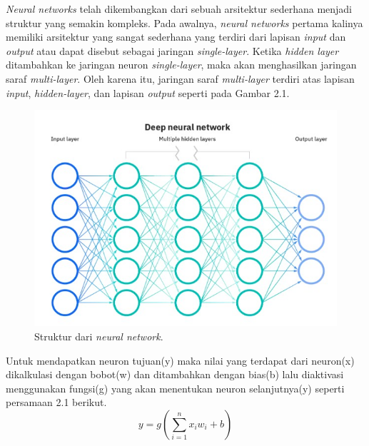 \emph{Neural networks} telah dikembangkan dari sebuah arsitektur sederhana menjadi struktur yang semakin
kompleks. Pada awalnya, \emph{neural networks} pertama kalinya memiliki arsitektur yang sangat sederhana yang terdiri dari lapisan \emph{input} dan \emph{output} atau dapat
disebut sebagai jaringan \emph{single-layer}. Ketika \emph{hidden layer} ditambahkan ke jaringan neuron \emph{single-layer}, maka akan menghasilkan
jaringan saraf \emph{multi-layer}. Oleh karena itu, jaringan saraf \emph{multi-layer} terdiri atas lapisan \emph{input}, \emph{hidden-layer}, dan lapisan \emph{output} seperti pada Gambar 2.1.
\begin{figure}[ht]
  \centering

  \includegraphics[scale=0.7]{gambar/neural-network.jpg}

  \caption{Struktur dari \emph{neural network}.}
  \label{fig:neural-network}
\end{figure}

Untuk mendapatkan neuron tujuan(y) maka nilai yang terdapat dari neuron(x) dikalkulasi dengan bobot(w) dan ditambahkan
dengan bias(b) lalu diaktivasi menggunakan fungsi(g) yang akan menentukan neuron selanjutnya(y) seperti persamaan 2.1 berikut.
\begin{equation}
  \label{eq:pers-neural-network}
  y = g (\sum_{i = 1}^{n}x_i w_i + b)
\end{equation}



